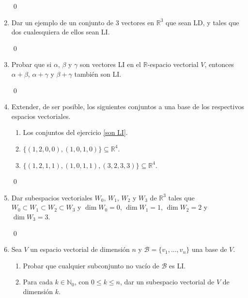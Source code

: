\begin{enumerate}[resume, topsep=6pt, itemsep=.4cm]
    
    \rta 

    \qed     
    
    \item Dar un ejemplo de un conjunto de 3 vectores en $\mathbb{R}^3$ que sean LD, y tales que dos cualesquiera de ellos sean LI.
    
    
    \rta 

    \qed     
    
    \item  Probar que si $\alpha$, $\beta$ y $\gamma$ son vectores LI en el $\mathbb{R}$-espacio vectorial $V$, entonces $\alpha +\beta$, $\alpha +\gamma$ y $\beta +\gamma $ también son LI.
    
    
    \rta 

    \qed     
    
    \item Extender, de ser posible, los siguientes conjuntos a una base de los respectivos espacios vectoriales.
    
    \begin{enumerate}
        \item Los conjuntos del ejercicio \ref{son LI}.
        \item\label{10b} $\{ (1,2,0,0),(1,0,1,0) \}\subseteq\mathbb{R}^4$.
        \item\label{10c} $\{ (1,2,1,1),(1,0,1,1),(3,2,3,3)\}\subseteq\mathbb{R}^4$.
    \end{enumerate}
    
    
    \rta 

    \qed     
    
    \item Dar subespacios vectoriales $W_0$, $W_1$, $W_2$ y $W_3$ de $\mathbb{R}^3$ tales que $W_0\subset W_1\subset W_2\subset W_3$ y $\dim W_0=0$, $\dim W_1=1$, $\dim W_2=2$ y $\dim W_3=3$.
    
    
    \rta 

    \qed     
    
    \item Sea $V$ un espacio vectorial de dimensión $n$ y $\mathcal{B}=\{v_1, ..., v_n\}$ una base de $V$.
    \begin{enumerate}
    \item Probar que cualquier subconjunto no vacío de $\mathcal{B}$ es LI.
    \item Para cada $k\in\mathbb{N}_0$,  con $0\leq k\leq n$, dar un subespacio vectorial de $V$ de dimensión $k$.
    \end{enumerate}
    

\end{enumerate}
